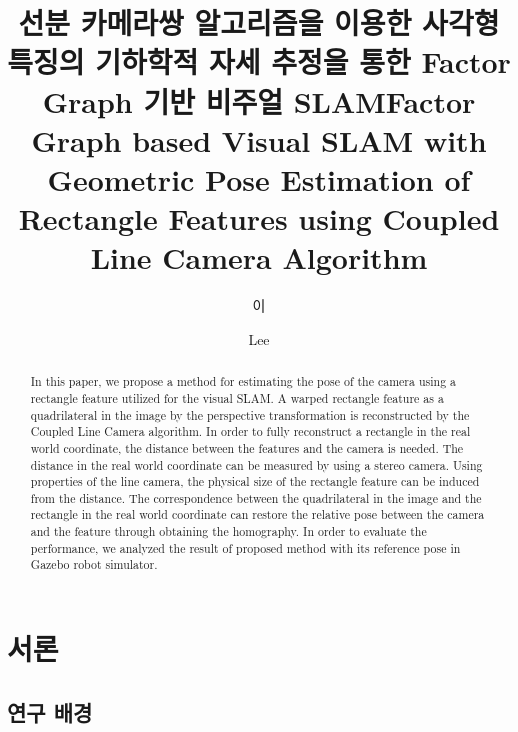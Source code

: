 \documentclass[master,korean,final]{cbnu-ecs}
\title[korean]{선분 카메라쌍 알고리즘을 이용한 사각형 특징의 기하학적 자세 추정을 통한 Factor Graph 기반 비주얼 SLAM}
\title[english]{Factor Graph based Visual SLAM with Geometric Pose Estimation of Rectangle Features using Coupled Line Camera Algorithm}
\author[korean] {이}{재 민}
\author[english]{Lee}{Jae-Min}
\begin{document}
\tableofcontents
\listoffigures
\listoftables
\begin{abstract}
In this paper, we propose a method for estimating the pose of the camera using a rectangle feature utilized for the  visual SLAM.  A warped rectangle feature as a quadrilateral in the image by the perspective transformation is reconstructed by the Coupled Line Camera algorithm. In order to fully reconstruct a rectangle in the real world coordinate, the distance between the features and the camera is needed. The distance in the real world coordinate can be measured by using a stereo camera. Using properties of the line camera, the physical size of the rectangle  feature can be induced from the distance. The correspondence between the quadrilateral in the image and the rectangle in the real world coordinate can restore the relative pose between the camera and the feature through obtaining the homography. In order to evaluate the performance, we analyzed the result of proposed method with its reference pose in Gazebo robot simulator.
\end{abstract}



\chapter{서론}
\section{연구 배경}
\end{document}
